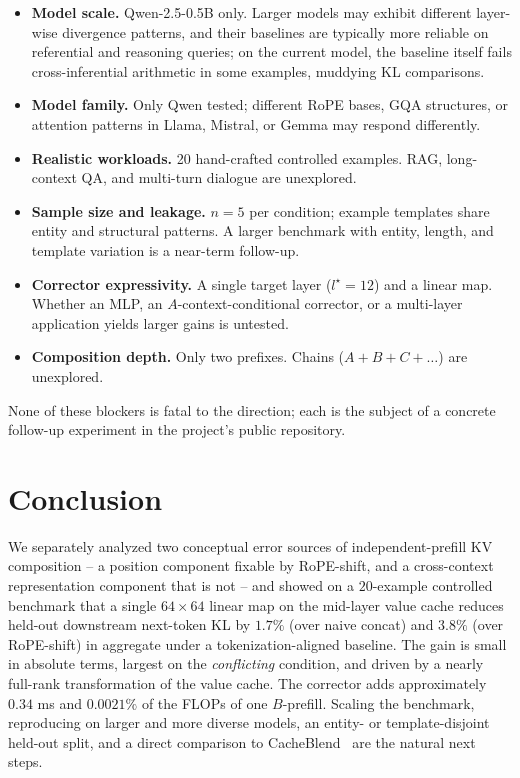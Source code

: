 \begin{itemize}[leftmargin=*]
    \item \textbf{Model scale.} Qwen-2.5-0.5B only. Larger models may exhibit different layer-wise divergence patterns, and their baselines are typically more reliable on referential and reasoning queries; on the current model, the baseline itself fails cross-inferential arithmetic in some examples, muddying KL comparisons.
    \item \textbf{Model family.} Only Qwen tested; different RoPE bases, GQA structures, or attention patterns in Llama, Mistral, or Gemma may respond differently.
    \item \textbf{Realistic workloads.} 20 hand-crafted controlled examples. RAG, long-context QA, and multi-turn dialogue are unexplored.
    \item \textbf{Sample size and leakage.} $n=5$ per condition; example templates share entity and structural patterns. A larger benchmark with entity, length, and template variation is a near-term follow-up.
    \item \textbf{Corrector expressivity.} A single target layer ($l^\star=12$) and a linear map. Whether an MLP, an $A$-context-conditional corrector, or a multi-layer application yields larger gains is untested.
    \item \textbf{Composition depth.} Only two prefixes. Chains ($A + B + C + \ldots$) are unexplored.
\end{itemize}

None of these blockers is fatal to the direction; each is the subject of a concrete follow-up experiment in the project's public repository.

\section{Conclusion}

We separately analyzed two conceptual error sources of independent-prefill KV composition -- a position component fixable by RoPE-shift, and a cross-context representation component that is not -- and showed on a $20$-example controlled benchmark that a single $64\times64$ linear map on the mid-layer value cache reduces held-out downstream next-token KL by $1.7\%$ (over naive concat) and $3.8\%$ (over RoPE-shift) in aggregate under a tokenization-aligned baseline. The gain is small in absolute terms, largest on the \emph{conflicting} condition, and driven by a nearly full-rank transformation of the value cache. The corrector adds approximately $0.34$ ms and $0.0021\%$ of the FLOPs of one $B$-prefill. Scaling the benchmark, reproducing on larger and more diverse models, an entity- or template-disjoint held-out split, and a direct comparison to CacheBlend~\citep{yao2024cacheblend} are the natural next steps.


